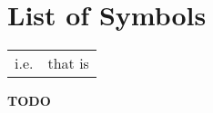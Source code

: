 \documentclass[11pt,a4paper,oneside]{book}	%
\begin{document}
\chapter{List of Symbols}

\begin{tabular}{ll}

i.e. & that is\\

\end{tabular}

\mainmatter











\backmatter

\textbf{TODO}



\end{document}
